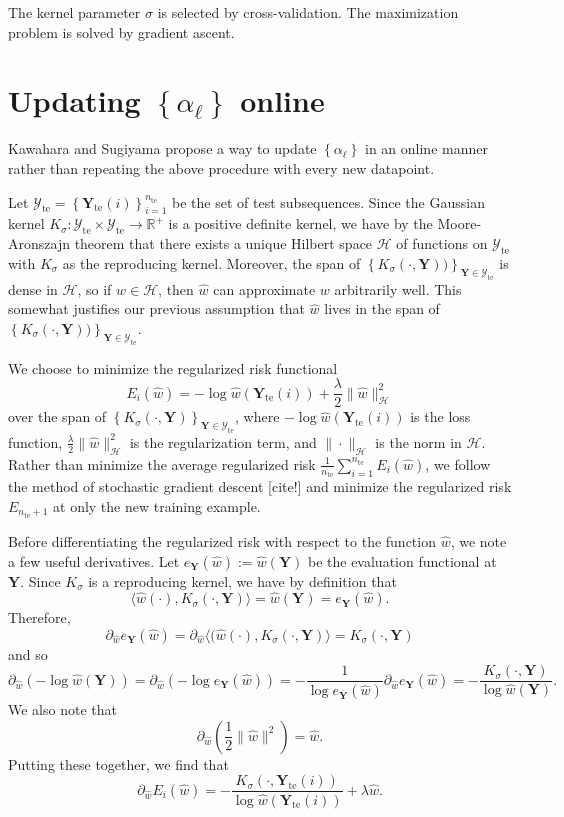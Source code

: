 \documentclass[12pt]{article}
\newcommand\prn[1]{\left( #1 \right)}
\newcommand\set[1]{\left\{ #1 \right\}}
\newcommand\RR{\mathbb{R}}
\newcommand\YY{{\boldsymbol{Y}}}
\newcommand\YYY{\mathcal{Y}}
\newcommand\HH{\mathcal{H}}
\newcommand\te{{\mathrm{te}}}
\begin{document}
The kernel parameter $\sigma$ is selected by cross-validation. The maximization problem is solved by gradient ascent.

\section{Updating $\set{\alpha_\ell}$ online}

Kawahara and Sugiyama propose a way to update $\set{\alpha_\ell}$ in an online manner rather than repeating the above procedure with every new datapoint.

Let $\YYY_\te=\set{\YY_\te(i)}_{i=1}^{n_\te}$ be the set of test subsequences. Since the Gaussian kernel $K_\sigma\colon\YYY_\te\times\YYY_\te\to\RR^+$ is a positive definite kernel, %
we have by the Moore-Aronszajn theorem that there exists a unique Hilbert space $\HH$ of functions on $\YYY_\te$ with $K_\sigma$ as the reproducing kernel. Moreover, the span of $\set{K_\sigma(\cdot,\YY))}_{\YY\in\YYY_\te}$ is dense in $\HH$, so if $w\in\HH$, then $\hat w$ can approximate $w$ arbitrarily well. This somewhat justifies our previous assumption that $\hat w$ lives in the span of $\set{K_\sigma(\cdot,\YY))}_{\YY\in\YYY_\te}$.

We choose to minimize the regularized risk functional
$$E_i(\hat w)=-\log\hat w(\YY_\te(i))+\frac{\lambda}{2}\|\hat w\|_\HH^2$$
over the span of $\set{K_\sigma(\cdot,\YY)}_{\YY\in\YYY_\te}$, where $-\log\hat w(\YY_\te(i))$ is the loss function, $\frac\lambda2\|\hat w\|_\HH^2$ is the regularization term, and $\|\cdot\|_\HH$ is the norm in $\HH$. Rather than minimize the average regularized risk $\frac{1}{n_\te}\sum_{i=1}^{n_\te}E_i(\hat w)$, we follow the method of stochastic gradient descent [cite!] and minimize the regularized risk $E_{n_\te+1}$ at only the new training example.

Before differentiating the regularized risk with respect to the function $\hat w$, we note a few useful derivatives. Let $e_\YY(\hat w):=\hat w(\YY)$ be the evaluation functional at $\YY$. Since $K_\sigma$ is a reproducing kernel, we have by definition that
$$\langle\hat w(\cdot),K_\sigma(\cdot,\YY)\rangle=\hat w(\YY)=e_\YY(\hat w).$$
Therefore,
$$\partial_{\hat w}e_\YY(\hat w)=\partial_{\hat w}\langle(\hat w(\cdot),K_\sigma(\cdot,\YY)\rangle=K_\sigma(\cdot,\YY)$$
and so
$$\partial_{\hat w}\prn{-\log\hat w(\YY)}
=\partial_{\hat w}\prn{-\log e_\YY(\hat w)}
=-\frac{1}{\log e_\YY(\hat w)}\partial_{\hat w}e_\YY(\hat w)
=-\frac{K_\sigma(\cdot,\YY)}{\log \hat w(\YY)}.
$$
We also note that
$$\partial_{\hat w}\prn{\frac12\|\hat w\|^2}=\hat w.$$
Putting these together, we find that
$$\partial_{\hat w}E_i(\hat w)=-\frac{K_\sigma(\cdot,\YY_\te(i))}{\log \hat w(\YY_\te(i))}+\lambda\hat w.$$
\end{document}
